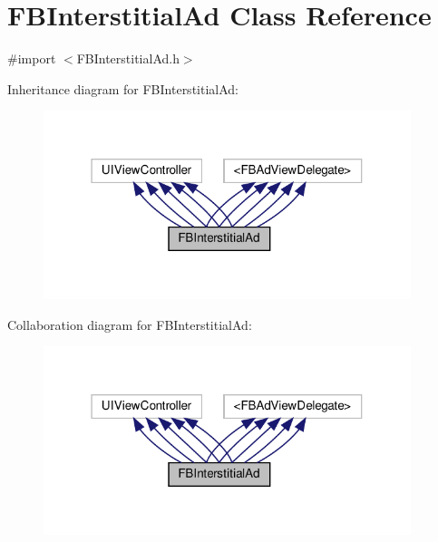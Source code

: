 \hypertarget{interfaceFBInterstitialAd}{}\section{F\+B\+Interstitial\+Ad Class Reference}
\label{interfaceFBInterstitialAd}


{\ttfamily \#import $<$F\+B\+Interstitial\+Ad.\+h$>$}



Inheritance diagram for F\+B\+Interstitial\+Ad\+:
\nopagebreak
\begin{figure}[H]
\begin{center}
\leavevmode
\includegraphics[width=304pt]{interfaceFBInterstitialAd__inherit__graph}
\end{center}
\end{figure}


Collaboration diagram for F\+B\+Interstitial\+Ad\+:
\nopagebreak
\begin{figure}[H]
\begin{center}
\leavevmode
\includegraphics[width=304pt]{interfaceFBInterstitialAd__coll__graph}
\end{center}
\end{figure}
